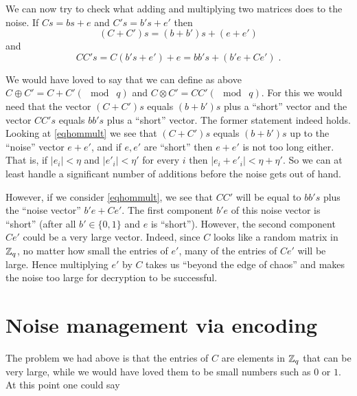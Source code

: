 We can now try to check what adding and multiplying two matrices does to
the noise. If \(Cs = bs+e\) and \(C's=b's+e'\) then
\[(C+C')s = (b+b')s+(e+e') \label{eqhomadd}\] and
\[\ensuremath{\mathit{CC}}'s = C(b's+e')+e =bb's+ (b'e+Ce')\;. \label{eqhommult} \]


We would have loved to say that we can define as above
\(C\oplus C' = C+C' (\mod\; q)\) and
\(C\otimes C' = \ensuremath{\mathit{CC}}' (\mod \; q)\). For this we
would need that the vector \((C+C')s\) equals \((b+b')s\) plus a
``short'' vector and the vector \(\ensuremath{\mathit{CC}}'s\) equals
\(bb's\) plus a ``short'' vector. The former statement indeed holds.
Looking at \eqref{eqhommult} we see that \((C+C')s\) equals \((b+b')s\)
up to the ``noise'' vector \(e+e'\), and if \(e,e'\) are ``short'' then
\(e+e'\) is not too long either. That is, if \(|e_i|<\eta\) and
\(|e'_i|<\eta'\) for every \(i\) then \(|e_i+e'_i|<\eta + \eta'\). So we
can at least handle a significant number of additions before the noise
gets out of hand.

However, if we consider \eqref{eqhommult}, we see that
\(\ensuremath{\mathit{CC}}'\) will be equal to \(bb's\) plus the ``noise
vector'' \(b'e + Ce'\). The first component \(b'e\) of this noise vector
is ``short'' (after all \(b'\in \{0,1\}\) and \(e\) is ``short'').
However, the second component \(Ce'\) could be a very large vector.
Indeed, since \(C\) looks like a random matrix in \({\mathbb{Z}}_q\), no matter
how small the entries of \(e'\), many of the entries of \(Ce'\) will be
large. Hence multiplying \(e'\) by \(C\) takes us ``beyond the edge of
chaos'' and makes the noise too large for decryption to be successful.

\section{Noise management via encoding}\label{15-Noise-management-via-e}

The problem we had above is that the entries of \(C\) are elements in
\({\mathbb{Z}}_q\) that can be very large, while we would have loved them to be
small numbers such as \(0\) or \(1\). At this point one could say

